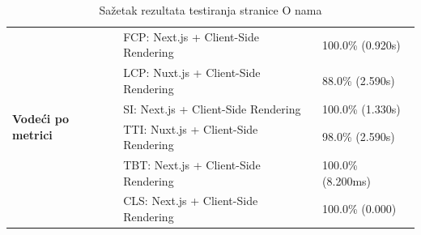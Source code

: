 \begin{table}[H]
{\begin{tabular}{|l|l|l|}
        \hline
        \multirow{6}{*}{\textbf{Vodeći po metrici}}
                            & FCP: Next.js + Client-Side Rendering         & 100.0\% (0.920s)  \\[0.2em]
                            & LCP: Nuxt.js + Client-Side Rendering         & 88.0\% (2.590s)   \\[0.2em]
                            & SI: Next.js + Client-Side Rendering          & 100.0\% (1.330s)  \\[0.2em]
                            & TTI: Nuxt.js + Client-Side Rendering         & 98.0\% (2.590s)   \\[0.2em]
                            & TBT: Next.js + Client-Side Rendering         & 100.0\% (8.200ms) \\[0.2em]
                            & CLS: Next.js + Client-Side Rendering         & 100.0\% (0.000)   \\
        \hline
    \end{tabular}%
}
\caption{Sažetak rezultata testiranja stranice O nama}

\end{table}


